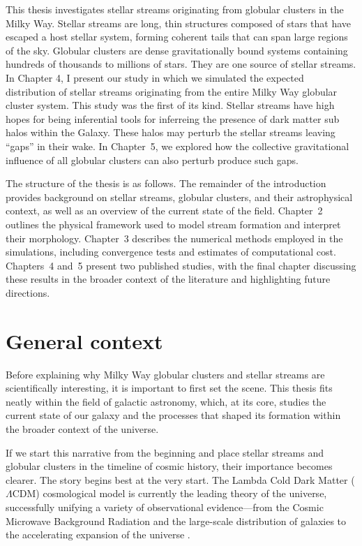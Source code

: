 This thesis investigates stellar streams originating from globular clusters in the Milky Way. Stellar streams are long, thin structures composed of stars that have escaped a host stellar system, forming coherent tails that can span large regions of the sky. Globular clusters are dense gravitationally bound systems containing hundreds of thousands to millions of stars. They are one source of stellar streams. In Chapter 4, I present our study in which we simulated the expected distribution of stellar streams originating from the entire Milky Way globular cluster system. This study was the first of its kind. Stellar streams have high hopes for being inferential tools for inferreing the presence of dark matter sub halos within the Galaxy. These halos may perturb the stellar streams leaving ``gaps'' in their wake. In Chapter~5, we explored how the collective gravitational influence of all globular clusters can also perturb produce such gaps.

The structure of the thesis is as follows. The remainder of the introduction provides background on stellar streams, globular clusters, and their astrophysical context, as well as an overview of the current state of the field. Chapter~2 outlines the physical framework used to model stream formation and interpret their morphology. Chapter~3 describes the numerical methods employed in the simulations, including convergence tests and estimates of computational cost. Chapters~4 and~5 present two published studies, with the final chapter discussing these results in the broader context of the literature and highlighting future directions.


\section{General context}
    Before explaining why Milky Way globular clusters and stellar streams are scientifically interesting, it is important to first set the scene. This thesis fits neatly within the field of galactic astronomy, which, at its core, studies the current state of our galaxy and the processes that shaped its formation within the broader context of the universe.

    If we start this narrative from the beginning and place stellar streams and globular clusters in the timeline of cosmic history, their importance becomes clearer. The story begins best at the very start. The Lambda Cold Dark Matter ($\Lambda$CDM) cosmological model is currently the leading theory of the universe, successfully unifying a variety of observational evidence—from the Cosmic Microwave Background Radiation and the large-scale distribution of galaxies to the accelerating expansion of the universe \citep{2001LRR.....4....1C,2022NewAR..9501659P}.

